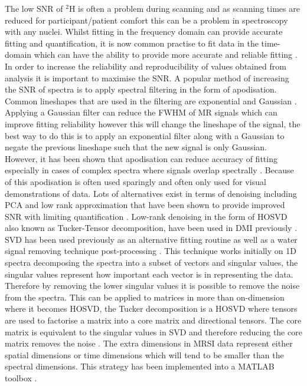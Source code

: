 The low \ac{SNR} of $^2$H is often a problem during scanning and as scanning times are reduced for participant/patient comfort this can be a problem in spectroscopy with any nuclei. Whilst fitting in the frequency domain can provide accurate fitting and quantification, it is now common practise to fit data in the time-domain which can have the ability to provide more accurate and reliable fitting \cite{Joliot1991InMethods}. In order to increase the reliability and reproducibility of values obtained from analysis it is important to maximise the \ac{SNR}. A popular method of increasing the \ac{SNR} of spectra is to apply spectral filtering in the form of apodisation. Common lineshapes that are used in the filtering are exponential and Gaussian \cite{Goryawala2020EffectsFitting}. Applying a Gaussian filter can reduce the \ac{FWHM} of MR signals which can improve fitting reliability however this will change the lineshape of the signal, the best way to do this is to apply an exponential filter along with a Gaussian to negate the previous lineshape such that the new signal is only Gaussian. However, it has been shown that apodisation can reduce accuracy of fitting especially in cases of complex spectra where signals overlap spectrally \cite{Bartha1999FactorsFiltering}. Because of this apodisation is often used sparingly and often only used for visual demonstrations of data. Lots of alternatives exist in terms of denoising including \ac{PCA} \cite{Abdoli2016DenoisingComponents} and low rank approximation \cite{Nguyen2013DenoisingApproximations} that have been shown to provide improved \ac{SNR} with limiting quantification \cite{Clarke2022UncertaintyMethods}. Low-rank denoising in the form of \ac{HOSVD} also known as Tucker-Tensor decomposition, have been used in \ac{DMI} previously \cite{Kreis2020MeasuringMRI,Assmann2020InCholesterol}. \ac{SVD} has been used previously as an alternative fitting routine \cite{Pijnappel1992SVD-basedSignals} as well as a water signal removing technique post-processing \cite{Cabanes2001OptimizationBrain}. This technique works initially on 1D spectra decomposing the spectra into a subset of vectors and singular values, the singular values represent how important each vector is in representing the data. Therefore by removing the lower singular values it is possible to remove the noise from the spectra. This can be applied to matrices in more than on-dimension where it becomes \ac{HOSVD}, the Tucker decomposition is a \ac{HOSVD} where tensors are used to factorise a matrix into a core matrix and directional tensors. The core matrix is equivalent to the singular values in \ac{SVD} and therefore reducing the core matrix removes the noise \cite{Tucker1966SomeAnalysis}. The extra dimensions in \ac{MRSI} data represent either spatial dimensions or time dimensions which will tend to be smaller than the spectral dimensions. This strategy has been implemented into a MATLAB toolbox \cite{Bader2007EfficientTensors}.

